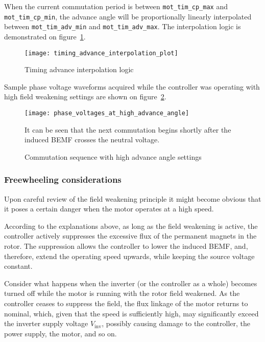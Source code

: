 \documentclass{zubaxdoc}
\begin{document}
When the current commutation period is between \verb|mot_tim_cp_max| and \verb|mot_tim_cp_min|,
the advance angle will be proportionally linearly interpolated between
\verb|mot_tim_adv_min| and \verb|mot_tim_adv_max|.
The interpolation logic is demonstrated on figure~\ref{timing_advance_interpolation_plot}.

\begin{figure}[hbt]
	\centering
	\texttt{[image: timing\_advance\_interpolation\_plot]}
	\caption{Timing advance interpolation logic
		\label{timing_advance_interpolation_plot}}
\end{figure}

Sample phase voltage waveforms acquired while the controller was operating with high field
weakening settings are shown on figure~\ref{phase_voltages_at_high_advance_angle}.

\begin{figure}[hbtp]
	\centering
	\texttt{[image: phase\_voltages\_at\_high\_advance\_angle]}
	\caption{Commutation sequence with high advance angle settings
		\label{phase_voltages_at_high_advance_angle}}
	It can be seen that the next commutation begins shortly after the induced BEMF
	crosses the neutral voltage.
\end{figure}

\subsubsection{Freewheeling considerations}

Upon careful review of the field weakening principle it might become obvious that it poses a certain danger
when the motor operates at a high speed.

According to the explanations above, as long as the field weakening is active,
the controller actively suppresses the excessive flux of the permanent magnets in the rotor.
The suppression allows the controller to lower the induced BEMF, and, therefore,
extend the operating speed upwards, while keeping the source voltage constant.

Consider what happens when the inverter (or the controller as a whole) becomes turned off while the
motor is running with the rotor field weakened.
As the controller ceases to suppress the field, the flux linkage of the motor returns to nominal,
which, given that the speed is sufficiently high, may significantly exceed the inverter supply
voltage $V_\text{inv}$, possibly causing damage to the controller, the power supply, the motor, and so on.
\end{document}
